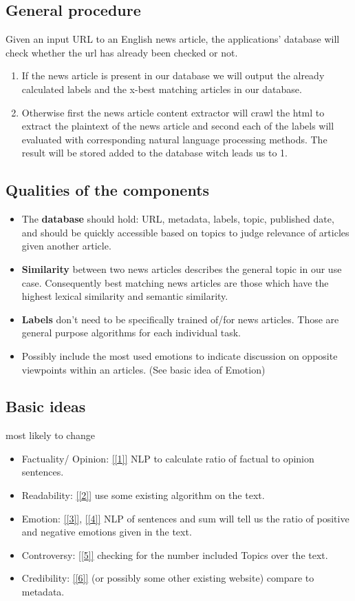 \documentclass[10pt]{article}
\begin{document}
\begin{multicols}{2}
\subsection{General procedure}
Given an input URL to an English news article, the applications' database will check whether the url has already been checked or not.
\begin{enumerate}
\item If the news article is present in our database we will output the already calculated labels and the x-best matching articles in our database.
\item Otherwise first the news article content extractor will crawl the html to extract the plaintext of the news article and second each of the labels will evaluated with corresponding natural language processing methods. The result will be stored added to the database witch leads us to 1.
\end{enumerate}

\subsection{Qualities of the components}
\begin{itemize}
\item The \textbf{database} should hold: URL, metadata, labels, topic, published date, and should be quickly accessible based on topics to judge relevance of articles given another article.
\item \textbf{Similarity} between two news articles describes the general topic in our use case. Consequently best matching news articles are those which have the highest lexical similarity and semantic similarity.
\item \textbf{Labels} don't need to be specifically trained of/for news articles. Those are general purpose algorithms for each individual task.
\item Possibly include the most used emotions to indicate discussion on opposite viewpoints within an articles. (See basic idea of Emotion)
\end{itemize}

\subsection{Basic ideas}
most likely to change
\begin{itemize}
\item Factuality/ Opinion: \ref{[1]} NLP to calculate ratio of factual to opinion sentences.
\item Readability:  \ref{[2]} use some existing algorithm on the text.
\item Emotion: \ref{[3]}, \ref{[4]} NLP of sentences and sum will tell us the ratio of positive and negative emotions given in the text.
\item Controversy: \ref{[5]} checking for the number included Topics over the text.
\item Credibility: \ref{[6]} (or possibly some other existing website) compare to metadata.
\end{itemize}



\end{multicols}
\end{document}
